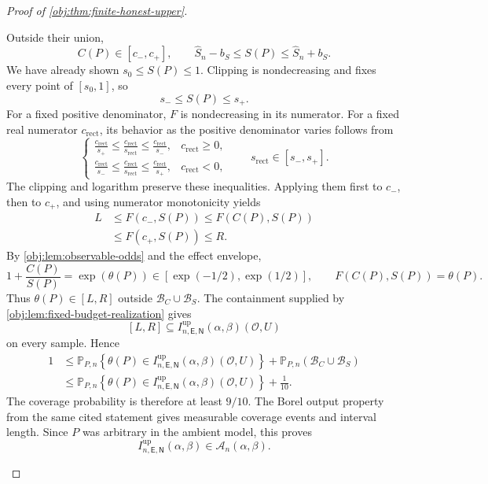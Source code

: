 \documentclass[11pt]{article}
\begin{document}
\begin{proof}[Proof of \cref{obj:thm:finite-honest-upper}]
\begin{enumerate}
Outside their union,
\[
C(P)\in[c_-,c_+],
\qquad
\widehat S_n-b_S\le S(P)\le\widehat S_n+b_S.
\]
We have already shown \(s_0\le S(P)\le1\).
Clipping is nondecreasing and fixes every point of \([s_0,1]\), so
\[
s_-\le S(P)\le s_+.
\]
For a fixed positive denominator, \(F\) is nondecreasing in its numerator.
For a fixed real numerator \(c_{\mathrm{rect}}\), its behavior as the positive denominator varies follows from
\[
\begin{cases}
\displaystyle
\frac{c_{\mathrm{rect}}}{s_+}
\le\frac{c_{\mathrm{rect}}}{s_{\mathrm{rect}}}
\le\frac{c_{\mathrm{rect}}}{s_-},
& c_{\mathrm{rect}}\ge0,\\[6pt]
\displaystyle
\frac{c_{\mathrm{rect}}}{s_-}
\le\frac{c_{\mathrm{rect}}}{s_{\mathrm{rect}}}
\le\frac{c_{\mathrm{rect}}}{s_+},
& c_{\mathrm{rect}}<0,
\end{cases}
\qquad
s_{\mathrm{rect}}\in[s_-,s_+].
\]
The clipping and logarithm preserve these inequalities. Applying them first to \(c_-\), then to \(c_+\), and using numerator monotonicity yields
\[
\begin{aligned}
L
&\le F(c_-,S(P))
\le F(C(P),S(P))\\
&\le F(c_+,S(P))
\le R.
\end{aligned}
\]
By \cref{obj:lem:observable-odds} and the effect envelope,
\[
1+\frac{C(P)}{S(P)}
=\exp(\theta(P))
\in[\exp(-1/2),\exp(1/2)],
\qquad
F(C(P),S(P))=\theta(P).
\]
Thus \(\theta(P)\in[L,R]\) outside \(\mathcal B_C\cup\mathcal B_S\).
The containment supplied by \cref{obj:lem:fixed-budget-realization} gives
\[
[L,R]\subseteq
I^{\mathrm{up}}_{n,\mathsf E,\mathsf N}(\alpha,\beta)(\mathcal O,U)
\]
on every sample. Hence
\[
\begin{aligned}
1
&\le
\mathbb P_{P,n}
\left\{
\theta(P)\in
I^{\mathrm{up}}_{n,\mathsf E,\mathsf N}(\alpha,\beta)(\mathcal O,U)
\right\}
+\mathbb P_{P,n}(\mathcal B_C\cup\mathcal B_S)\\
&\le
\mathbb P_{P,n}
\left\{
\theta(P)\in
I^{\mathrm{up}}_{n,\mathsf E,\mathsf N}(\alpha,\beta)(\mathcal O,U)
\right\}
+\frac1{10}.
\end{aligned}
\]
The coverage probability is therefore at least \(9/10\).
The Borel output property from the same cited statement gives measurable coverage events and interval length. Since \(P\) was arbitrary in the ambient model, this proves
\[
I^{\mathrm{up}}_{n,\mathsf E,\mathsf N}(\alpha,\beta)
\in\mathcal A_n(\alpha,\beta).
\]


\end{enumerate}
\end{proof}
\end{document}
